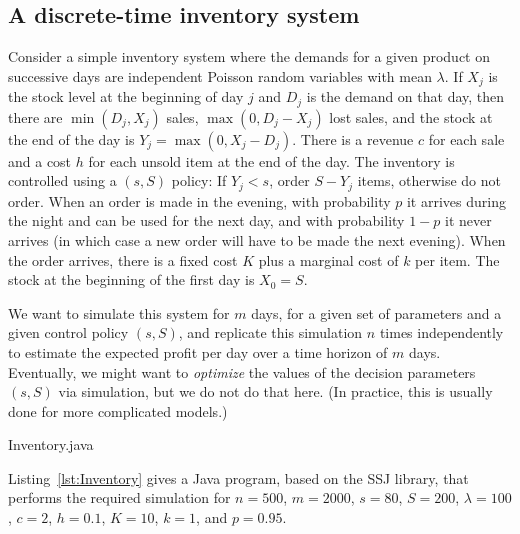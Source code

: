 \subsection {A discrete-time inventory system}
\label {sec:inventory}

Consider a simple inventory system where the demands for a given product
on successive days are independent Poisson random variables with mean
$\lambda$.  If $X_j$ is the stock level at the beginning of day $j$ and
$D_j$ is the demand on that day, then there are $\min(D_j, X_j)$ sales,
$\max(0, D_j - X_j)$ lost sales, and the stock at the end of the day
is $Y_j = \max(0, X_j - D_j)$.
There is a revenue $c$ for each sale and a cost $h$ for each unsold
item at the end of the day.
The inventory is controlled using a $(s,S)$ policy:
If $Y_j < s$, order $S - Y_j$ items, otherwise do not order.
When an order is made in the evening, with probability $p$
it arrives during the night and can be used for the next day,
and with probability $1-p$ it never arrives (in which case a new order
will have to be made the next evening).
When the order arrives, there is a fixed cost $K$ plus a marginal cost
of $k$ per item.
The stock at the beginning of the first day is $X_0 = S$.

We want to simulate this system for $m$ days, for a given set of
parameters and a given control policy $(s,S)$, and replicate this
simulation $n$ times independently to estimate the
expected profit per day over a time horizon of $m$ days.
Eventually, we might want to \emph{optimize} the values of the decision
parameters $(s,S)$ via simulation, but we do not do that here.
(In practice, this is usually done for more complicated models.)



{Inventory.java}


Listing~\ref{lst:Inventory} gives a Java program, based on the SSJ
library, that performs the required simulation for $n=500$, $m=2000$,
$s=80$, $S=200$, $\lambda=100$, $c=2$, $h=0.1$, $K=10$, $k=1$, and $p=0.95$.

